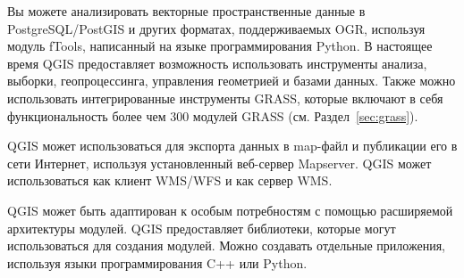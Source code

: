 
Вы можете анализировать векторные пространственные данные в PostgreSQL/PostGIS
и других форматах, поддерживаемых OGR, используя модуль fTools, написанный на
языке программирования Python. В настоящее время QGIS предоставляет возможность
использовать инструменты анализа, выборки, геопроцессинга, управления
геометрией и базами данных. Также можно использовать интегрированные
инструменты GRASS, которые включают в себя функциональность более чем
300 модулей GRASS (см. Раздел~\ref{sec:grass}).


QGIS может использоваться для экспорта данных в map-файл и публикации
его в сети Интернет, используя установленный веб-сервер Mapserver.
QGIS может использоваться как клиент WMS/WFS и как сервер WMS.


QGIS может быть адаптирован к особым потребностям с помощью расширяемой
архитектуры модулей. QGIS предоставляет библиотеки, которые могут
использоваться для создания модулей. Можно создавать отдельные
приложения, используя языки программирования C++ или Python.


